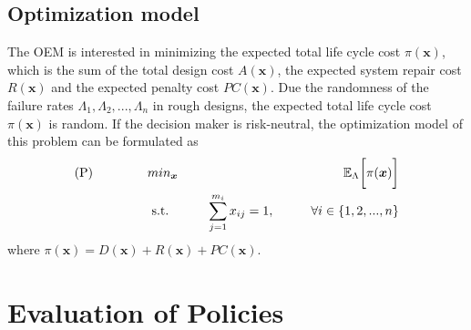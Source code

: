 \documentclass[10pt,a4paper]{article}
\begin{document}
\subsection{Optimization model}
The OEM is interested in minimizing the expected total life cycle cost $\pi(\boldsymbol{x})$, which is the sum of the total design cost $A(\boldsymbol{x})$, the expected system repair cost $R(\boldsymbol{x})$ and the expected penalty cost $PC(\boldsymbol{x})$. Due the randomness of the failure rates $\Lambda_1,\Lambda_2,...,\Lambda_n$ in rough designs, the expected total life cycle cost $\pi(\boldsymbol{x})$ is random. If the decision maker is risk-neutral, the optimization model of this problem can be formulated as
\begin{eqnarray}
\text{(P)} \hspace{15mm} & min_{\boldsymbol{x}} & \hspace{10mm} \mathbb{E}_{\Lambda} \bigg[ \pi(\boldsymbol{x})\bigg] \nonumber\\
& \text{ s.t. }&  \hspace{5mm} \sum_{j=1}^{m_i}{x_{ij}}=1, \hspace{10mm} \forall i \in \{1,2,...,n\} \nonumber
\end{eqnarray}
where $\pi(\boldsymbol{x})=D(\boldsymbol{x})+R(\boldsymbol{x})+PC(\boldsymbol{x})$.
%
\section{Evaluation of Policies}
\end{document}
